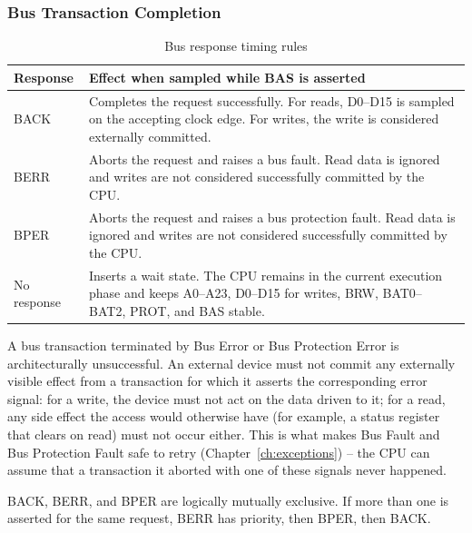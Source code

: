 \subsubsection{Bus Transaction Completion}

\begin{table}[H]
	\centering
	\small
	\begin{tabularx}{\textwidth}{lX}
		\toprule
		\textbf{Response} & \textbf{Effect when sampled while BAS is asserted}                                                                                                       \\
		\midrule
		BACK              & Completes the request successfully. For reads, D0--D15 is sampled on the accepting clock edge. For writes, the write is considered externally committed. \\
		BERR              & Aborts the request and raises a bus fault. Read data is ignored and writes are not considered successfully committed by the CPU.                         \\
		BPER              & Aborts the request and raises a bus protection fault. Read data is ignored and writes are not considered successfully committed by the CPU.              \\
		No response       & Inserts a wait state. The CPU remains in the current execution phase and keeps A0--A23, D0--D15 for writes, BRW, BAT0--BAT2, PROT, and BAS stable.       \\
		\bottomrule
	\end{tabularx}
	\caption{Bus response timing rules}
	\label{tab:bus-response-timing-rules}
\end{table}

A bus transaction terminated by Bus Error or Bus Protection Error is architecturally unsuccessful. An external device
must not commit any externally visible effect from a transaction for which it asserts the corresponding error signal:
for a write, the device must not act on the data driven to it; for a read, any side effect the access would otherwise
have (for example, a status register that clears on read) must not occur either. This is what makes Bus Fault and Bus
Protection Fault safe to retry (Chapter~\ref{ch:exceptions}) -- the CPU can assume that a transaction it aborted with
one of these signals never happened.

BACK, BERR, and BPER are logically mutually exclusive. If more than one is asserted for the same request, BERR has
priority, then BPER, then BACK.

